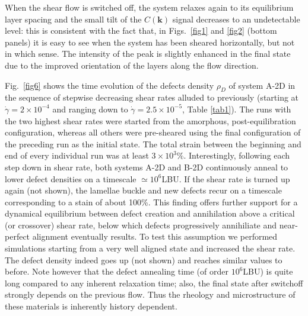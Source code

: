 \documentclass[8.5pt,twoside,twocolumn]{article}
\newcommand{\e}[1]{\times10^{#1}}
\newcommand{\gd}{\dot{\gamma}}
\begin{document}
When the shear flow is switched off, the system relaxes again to its equilibrium layer spacing and the small tilt of the $C({\bm k})$ signal decreases to an undetectable level: this is consistent with the fact that, in Figs.~\ref{fig1} and \ref{fig2} (bottom panels) it is easy to see when the system has been sheared horizontally, but not in which sense. The intensity of the peak is slightly enhanced in the final state due to the improved orientation of the layers along the flow direction.

Fig.~\ref{fig6} shows the time evolution of the defects density $\rho_D$ of system A-2D in the sequence of stepwise decreasing shear rates alluded to previously (starting at $\gd=2\e{-4}$ and ranging down to $\gd=2.5\e{-5}$, Table \ref{tab1}).
The runs with the two highest shear rates were started from the amorphous, post-equilibration configuration, whereas all others were pre-sheared using the final configuration of the preceding run as the initial state.
The total strain between the beginning and end of every individual run was at least $3\times 10^{3}\%$.
Interestingly, following each step down in shear rate, both systems A-2D and B-2D continuously anneal to lower defect densities on a timescale $\simeq 10^6$LBU. If the shear rate is turned up again (not shown), the lamellae buckle and new defects recur on a timescale corresponding to a stain of about 100\%. 
This finding offers further support for a dynamical equilibrium between defect creation and annihilation above a critical (or crossover) shear rate, below which defects progressively annihiliate and near-perfect alignment eventually results.
To test this assumption we performed simulations starting from a very well aligned state and increased the shear rate.
The defect density indeed goes up (not shown) and reaches similar values to before. Note however that the defect annealing time (of order $10^6$LBU) is quite long compared to any inherent relaxation time; also, the final state after switchoff strongly depends on the previous flow. Thus the rheology and microstructure of these materials is inherently history dependent.
\end{document}

